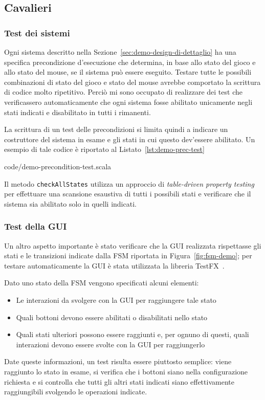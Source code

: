 \subsection{Cavalieri}\label{subsec:demo-cavalieri}
\subsubsection{Test dei sistemi}
Ogni sistema descritto nella Sezione~\ref{sec:demo-design-di-dettaglio} ha una specifica precondizione d'esecuzione
che determina, in base allo stato del gioco e allo stato del mouse, se il sistema può essere eseguito.
Testare tutte le possibili combinazioni di stato del gioco e stato del mouse avrebbe comportato la scrittura di codice
molto ripetitivo.
Perciò mi sono occupato di realizzare dei test che verificassero automaticamente che ogni sistema
fosse abilitato unicamente negli stati indicati e disabilitato in tutti i rimanenti.

La scrittura di un test delle precondizioni si limita quindi a indicare un costruttore del sistema in esame e
gli stati in cui questo dev'essere abilitato.
Un esempio di tale codice è riportato al Listato~\ref{lst:demo-prec-test}


{code/demo-precondition-test.scala}

Il metodo \texttt{checkAllStates} utilizza un approccio di \textit{table-driven property testing} per effettuare
una scansione esaustiva di tutti i possibili stati e verificare che il sistema sia abilitato solo in quelli indicati.

\subsubsection{Test della GUI}
Un altro aspetto importante è stato verificare che la GUI realizzata rispettasse gli stati e le transizioni indicate
dalla FSM riportata in Figura~\ref{fig:fsm-demo};
per testare automaticamente la GUI è stata utilizzata la libreria TestFX~\cite{testfx}.

Dato uno stato della FSM vengono specificati alcuni elementi:
\begin{itemize}
    \item Le interazioni da svolgere con la GUI per raggiungere tale stato
    \item Quali bottoni devono essere abilitati o disabilitati nello stato
    \item Quali stati ulteriori possono essere raggiunti e, per ognuno di questi, quali interazioni devono essere svolte
    con la GUI per raggiungerlo
\end{itemize}
Date queste informazioni, un test risulta essere piuttosto semplice: viene raggiunto lo stato in esame, si verifica che
i bottoni siano nella configurazione richiesta e si controlla che tutti gli altri stati indicati siano effettivamente
raggiungibili svolgendo le operazioni indicate.

